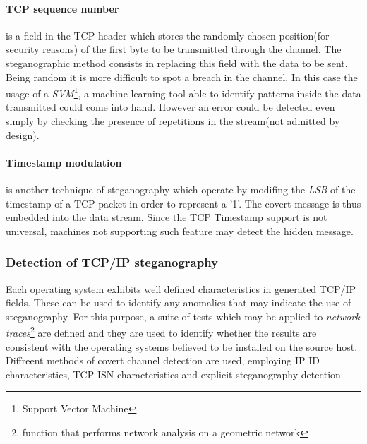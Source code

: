 \documentclass[../../main.tex]{subfiles}
\begin{document}
    \paragraph{TCP sequence number} is a field in the TCP header which stores
    the randomly chosen position(for security reasons) of the first byte to be
    transmitted through the channel. The steganographic method consists in
    replacing this field with the data to be sent.
    Being random it is more difficult to spot a breach in the channel.
    In this case the usage of a \emph{SVM}\footnote{Support Vector Machine}, a
    machine learning tool able to identify patterns inside the data transmitted
    could come into hand.
    However an error could be detected even simply by checking the presence of
    repetitions in the stream(not admitted by design). 

    \paragraph{Timestamp modulation} is another technique of steganography which
    operate by modifing the \emph{LSB} of the
    timestamp of a TCP packet in order to represent a '1'.
    The covert message is thus embedded into the data stream.
    Since the TCP Timestamp support is not universal, machines not supporting
    such feature may detect the hidden message.


    \subsubsection{Detection of TCP/IP steganography}

    Each operating system exhibits well defined characteristics in generated
    TCP/IP fields. These can be used to identify any anomalies that may indicate 
    the use of steganography. For this purpose, a suite of tests which may be
    applied to \emph{network traces}\footnote{function that performs network
    analysis on a geometric network} are defined and they are used to identify
    whether the results are consistent with the operating systems believed to be
    installed on the source host.
    Diffreent methods of covert channel detection are used, employing IP ID 
    characteristics, TCP ISN characteristics and explicit steganography
    detection.
\end{document}
